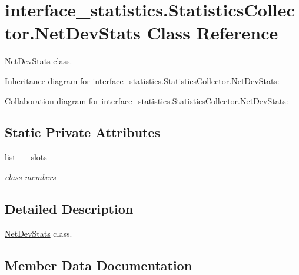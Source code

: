 \hypertarget{classinterface__statistics_1_1StatisticsCollector_1_1NetDevStats}{}\section{interface\+\_\+statistics.\+Statistics\+Collector.\+Net\+Dev\+Stats Class Reference}
\label{classinterface__statistics_1_1StatisticsCollector_1_1NetDevStats}


\hyperlink{classinterface__statistics_1_1StatisticsCollector_1_1NetDevStats}{Net\+Dev\+Stats} class.  




Inheritance diagram for interface\+\_\+statistics.\+Statistics\+Collector.\+Net\+Dev\+Stats\+:


Collaboration diagram for interface\+\_\+statistics.\+Statistics\+Collector.\+Net\+Dev\+Stats\+:
\subsection*{Static Private Attributes}
\begin{DoxyCompactItemize}
\item 
\hyperlink{openflow-interface_8h_afd9bcfa176617760671b67580f536fa7}{list} \hyperlink{classinterface__statistics_1_1StatisticsCollector_1_1NetDevStats_a54ce7afee917d8d3bf33fe9ba2db86bf}{\+\_\+\+\_\+slots\+\_\+\+\_\+}
\begin{DoxyCompactList}\small\item\em class members \end{DoxyCompactList}\end{DoxyCompactItemize}


\subsection{Detailed Description}
\hyperlink{classinterface__statistics_1_1StatisticsCollector_1_1NetDevStats}{Net\+Dev\+Stats} class. 

\subsection{Member Data Documentation}
